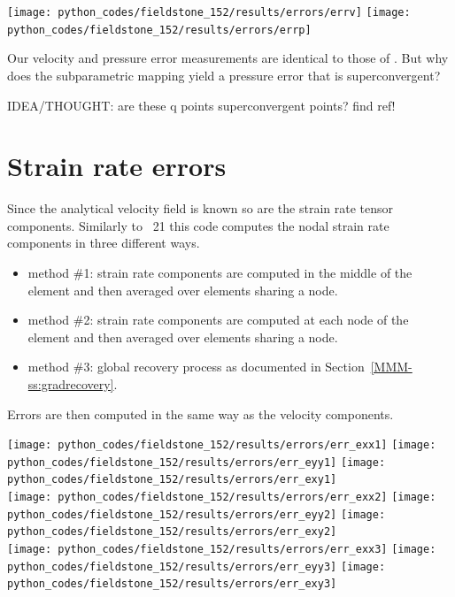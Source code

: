 \begin{center}
\texttt{[image: python\_codes/fieldstone\_152/results/errors/errv]}
\texttt{[image: python\_codes/fieldstone\_152/results/errors/errp]}
\end{center}

Our velocity and pressure error measurements are identical to those of \aspect.
But why does the subparametric mapping yield a pressure error that is superconvergent?

IDEA/THOUGHT: are these q points superconvergent points? find ref!

\newpage

\section*{Strain rate errors}

Since the analytical velocity field is known so are the strain rate tensor components.
Similarly to \stone~21 this code computes the nodal strain rate components
in three different ways. 
\begin{itemize}
\item method \#1: strain rate components are computed in the middle of the element and then averaged over elements sharing a node.
\item method \#2: strain rate components are computed at each node of the element and then averaged over elements sharing a node.
\item method \#3: global recovery process as documented in Section~\ref{MMM-ss:gradrecovery}.
\end{itemize}

Errors are then computed in the same way as the velocity components.

\begin{center}
\texttt{[image: python\_codes/fieldstone\_152/results/errors/err\_exx1]}
\texttt{[image: python\_codes/fieldstone\_152/results/errors/err\_eyy1]}
\texttt{[image: python\_codes/fieldstone\_152/results/errors/err\_exy1]}\\
\texttt{[image: python\_codes/fieldstone\_152/results/errors/err\_exx2]}
\texttt{[image: python\_codes/fieldstone\_152/results/errors/err\_eyy2]}
\texttt{[image: python\_codes/fieldstone\_152/results/errors/err\_exy2]}\\
\texttt{[image: python\_codes/fieldstone\_152/results/errors/err\_exx3]}
\texttt{[image: python\_codes/fieldstone\_152/results/errors/err\_eyy3]}
\texttt{[image: python\_codes/fieldstone\_152/results/errors/err\_exy3]}
\end{center}

